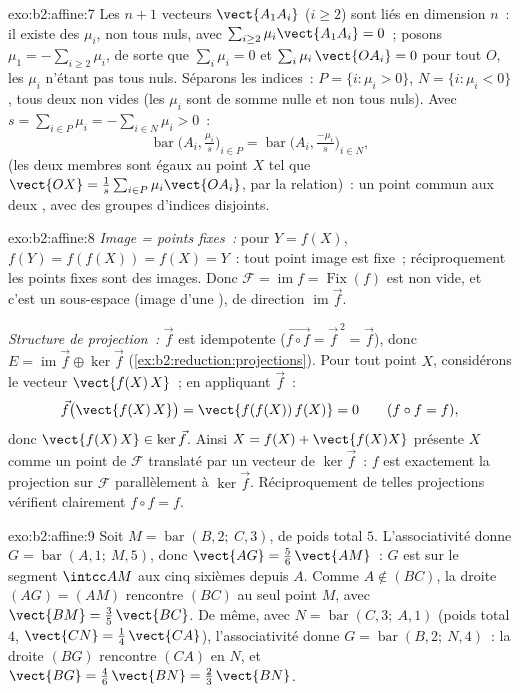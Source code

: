 \begin{solution}{exo:b2:affine:7}
Les $n + 1$ vecteurs $\vect{A_1A_i}$ ($i \geq 2$) sont liés en
dimension $n$~: il existe des $\mu_i$, non tous nuls, avec
$\sum_{i\geq2} \mu_i\vect{A_1A_i} = 0$~; posons $\mu_1 = -\sum_{i \geq
2}\mu_i$, de sorte que $\sum_{i}\mu_i = 0$ et $\sum_i \mu_i\,\vect{OA_i}
= 0$ pour tout $O$, les $\mu_i$ n'étant pas tous nuls. Séparons les
indices~: $P = \{i : \mu_i > 0\}$, $N = \{i : \mu_i < 0\}$, tous deux
non vides (les $\mu_i$ sont de somme nulle et non tous nuls). Avec $s =
\sum_{i\in P}\mu_i = -\sum_{i \in N}\mu_i > 0$~:
\[
\operatorname{bar}\bigl(A_i, \tfrac{\mu_i}{s}\bigr)_{i \in P}
= \operatorname{bar}\bigl(A_i, \tfrac{-\mu_i}{s}\bigr)_{i \in N},
\]
(les deux membres sont égaux au point $X$ tel que $\vect{OX} =
\frac1s\sum_{i\in P}\mu_i\vect{OA_i}$, par la relation)~: un point
commun aux deux , avec des groupes d'indices
disjoints.
\end{solution}

\begin{solution}{exo:b2:affine:8}
\emph{Image = points fixes~:} pour $Y = f(X)$, $f(Y) = f(f(X)) =
f(X) = Y$~: tout point image est fixe~; réciproquement les points fixes
sont des images. Donc $\mathcal{F} = \operatorname{im} f =
\operatorname{Fix}(f)$ est non vide, et c'est un sous-espace 
(image d'une ), de direction $\operatorname{im}\vec
f$.

\emph{Structure de projection~:} $\vec f$ est idempotente ($\vec{f\circ
f} = \vec f^{\,2} = \vec f$), donc $E = \operatorname{im}\vec f
\oplus \ker \vec f$ (\cref{ex:b2:reduction:projections}). Pour tout
point $X$, considérons le vecteur $\vect{f(X)\,X}$~; en appliquant
$\vec f$~:
\[
\vec f\bigl(\vect{f(X)\,X}\bigr) = \vect{f(f(X))\,f(X)} = 0
\qquad (f \circ f = f),
\]
donc $\vect{f(X)\,X} \in \ker\vec f$. Ainsi $X = f(X) +
\vect{f(X)X}$ présente $X$ comme un point de $\mathcal{F}$ translaté
par un vecteur de $\ker\vec f$~: $f$ est exactement la projection sur
$\mathcal{F}$ parallèlement à $\ker\vec f$. Réciproquement de telles
projections vérifient clairement $f \circ f = f$.
\end{solution}

\begin{solution}{exo:b2:affine:9}
Soit $M = \operatorname{bar}(B, 2;\ C, 3)$, de poids total $5$.
L'associativité donne $G = \operatorname{bar}(A, 1;\ M, 5)$, donc
$\vect{AG} = \frac56\,\vect{AM}$~: $G$ est sur le segment
$\intcc AM$ aux cinq sixièmes depuis $A$. Comme $A \notin
(BC)$, la droite $(AG) = (AM)$ rencontre $(BC)$ au seul point
$M$, avec $\vect{BM} = \frac35\,\vect{BC}$. De même, avec $N =
\operatorname{bar}(C, 3;\ A, 1)$ (poids total $4$, $\vect{CN}
= \frac14\,\vect{CA}$), l'associativité donne $G =
\operatorname{bar}(B, 2;\ N, 4)$~: la droite $(BG)$ rencontre $(CA)$
en $N$, et $\vect{BG} = \frac46\,\vect{BN} =
\frac23\,\vect{BN}$.
\end{solution}


